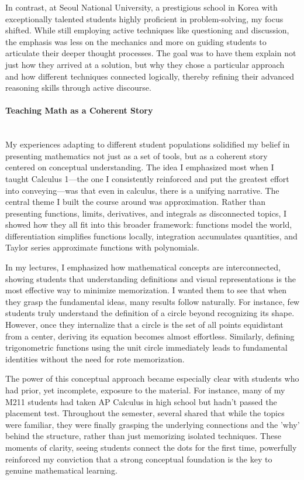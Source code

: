 \documentclass[11pt]{article}
\begin{document}
In contrast, at Seoul National University, a prestigious school in Korea with exceptionally talented students highly proficient in problem-solving, my focus shifted. While still employing active techniques like questioning and discussion, the emphasis was less on the mechanics and more on guiding students to articulate their deeper thought processes. The goal was to have them explain not just how they arrived at a solution, but why they chose a particular approach and how different techniques connected logically, thereby refining their advanced reasoning skills through active discourse.

\paragraph{Teaching Math as a Coherent Story} \quad \\
My experiences adapting to different student populations solidified my belief in presenting mathematics not just as a set of tools, but as a coherent story centered on conceptual understanding. The idea I emphasized most when I taught Calculus 1—the one I consistently reinforced and put the greatest effort into conveying—was that even in calculus, there is a unifying narrative. The central theme I built the course around was approximation. Rather than presenting functions, limits, derivatives, and integrals as disconnected topics, I showed how they all fit into this broader framework: functions model the world, differentiation simplifies functions locally, integration accumulates quantities, and Taylor series approximate functions with polynomials.

In my lectures, I emphasized how mathematical concepts are interconnected, showing students that understanding definitions and visual representations is the most effective way to minimize memorization. I wanted them to see that when they grasp the fundamental ideas, many results follow naturally. For instance, few students truly understand the definition of a circle beyond recognizing its shape. However, once they internalize that a circle is the set of all points equidistant from a center, deriving its equation becomes almost effortless. Similarly, defining trigonometric functions using the unit circle immediately leads to fundamental identities without the need for rote memorization.

The power of this conceptual approach became especially clear with students who had prior, yet incomplete, exposure to the material. For instance, many of my M211 students had taken AP Calculus in high school but hadn't passed the placement test. Throughout the semester, several shared that while the topics were familiar, they were finally grasping the underlying connections and the 'why' behind the structure, rather than just memorizing isolated techniques. These moments of clarity, seeing students connect the dots for the first time, powerfully reinforced my conviction that a strong conceptual foundation is the key to genuine mathematical learning.
\end{document}
